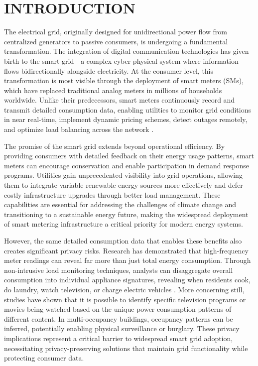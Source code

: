 \documentclass[conference]{IEEEtran}
\begin{document}
\section{INTRODUCTION}

The electrical grid, originally designed for unidirectional power flow from centralized generators to passive consumers, is undergoing a fundamental transformation. The integration of digital communication technologies has given birth to the smart grid—a complex cyber-physical system where information flows bidirectionally alongside electricity. At the consumer level, this transformation is most visible through the deployment of smart meters (SMs), which have replaced traditional analog meters in millions of households worldwide. Unlike their predecessors, smart meters continuously record and transmit detailed consumption data, enabling utilities to monitor grid conditions in near real-time, implement dynamic pricing schemes, detect outages remotely, and optimize load balancing across the network \cite{tan2017survey}.

The promise of the smart grid extends beyond operational efficiency. By providing consumers with detailed feedback on their energy usage patterns, smart meters can encourage conservation and enable participation in demand response programs. Utilities gain unprecedented visibility into grid operations, allowing them to integrate variable renewable energy sources more effectively and defer costly infrastructure upgrades through better load management. These capabilities are essential for addressing the challenges of climate change and transitioning to a sustainable energy future, making the widespread deployment of smart metering infrastructure a critical priority for modern energy systems.

However, the same detailed consumption data that enables these benefits also creates significant privacy risks. Research has demonstrated that high-frequency meter readings can reveal far more than just total energy consumption. Through non-intrusive load monitoring techniques, analysts can disaggregate overall consumption into individual appliance signatures, revealing when residents cook, do laundry, watch television, or charge electric vehicles \cite{greveler2012multimedia}. More concerning still, studies have shown that it is possible to identify specific television programs or movies being watched based on the unique power consumption patterns of different content. In multi-occupancy buildings, occupancy patterns can be inferred, potentially enabling physical surveillance or burglary. These privacy implications represent a critical barrier to widespread smart grid adoption, necessitating privacy-preserving solutions that maintain grid functionality while protecting consumer data.
\end{document}
